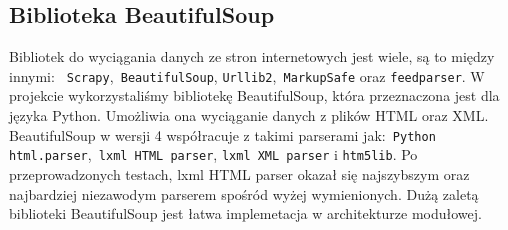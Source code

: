 \documentclass[12pt, titlepage]{article}
\begin{document}
	\subsection{Biblioteka BeautifulSoup}
	Bibliotek do wyciągania danych ze stron internetowych jest wiele, są to między innymi: \texttt{ Scrapy},\texttt{ BeautifulSoup}, \texttt{Urllib2},\texttt{ MarkupSafe} oraz \texttt{feedparser}. W projekcie wykorzystaliśmy bibliotekę BeautifulSoup, która przeznaczona jest dla języka Python. Umożliwia ona wyciąganie danych z plików HTML oraz XML. BeautifulSoup w wersji 4 współracuje z takimi parserami jak:\texttt{ Python html.parser},\texttt{ lxml HTML parser}, \texttt{lxml XML parser} i \texttt{htm5lib}. Po przeprowadzonych testach, lxml HTML parser okazał się najszybszym oraz najbardziej niezawodym parserem spośród wyżej wymienionych. Dużą zaletą biblioteki BeautifulSoup jest łatwa implemetacja w architekturze modułowej.

	\newpage
\end{document}
